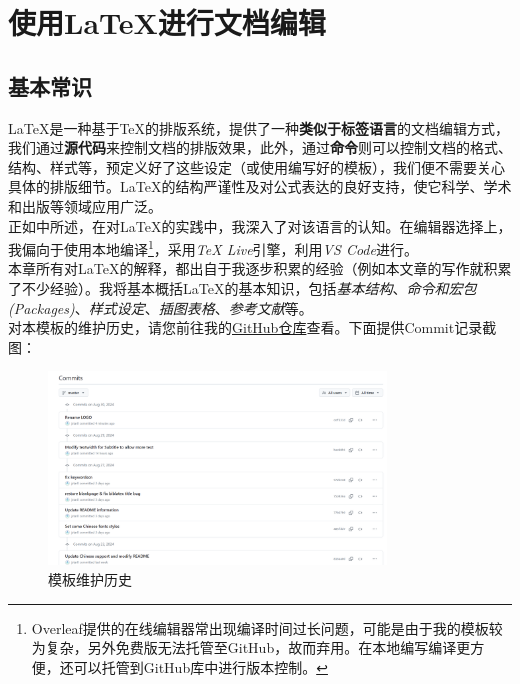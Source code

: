 \chapter{使用\LaTeX{}进行文档编辑}
\label{cp:latex}

\section{基本常识}

\LaTeX{}是一种基于\TeX{}的排版系统，提供了一种\textbf{类似于标签语言}的文档编辑方式，我们通过\textbf{源代码}来控制文档的排版效果，此外，通过\textbf{命令}则可以控制文档的格式、结构、样式等，预定义好了这些设定（或使用编写好的模板），我们便不需要关心具体的排版细节。\LaTeX{}的结构严谨性及对公式表达的良好支持，使它科学、学术和出版等领域应用广泛。\\

正如中所述，在对\LaTeX{}的实践中，我深入了对该语言的认知。在编辑器选择上，我偏向于使用本地编译\footnote{Overleaf提供的在线编辑器常出现编译时间过长问题，可能是由于我的模板较为复杂，另外免费版无法托管至GitHub，故而弃用。在本地编写编译更方便，还可以托管到GitHub库中进行版本控制。}，采用\textit{TeX Live}引擎，利用\textit{VS Code}进行。\\

本章所有对\LaTeX{}的解释，都出自于我逐步积累的经验（例如本文章的写作就积累了不少经验）。我将基本概括\LaTeX{}的基本知识，包括\textit{基本结构}、\textit{命令和宏包(Packages)}、\textit{样式设定}、\textit{插图表格}、\textit{参考文献}等。\\

对本模板的维护历史，请您前往我的\href{https://github.com/jstar0/LaTeXTemplate}{GitHub仓库}查看。下面提供Commit记录截图：

\begin{figure}[h!]
    \centering
    \includegraphics[width=0.8\textwidth]{Figures/git-latex-history.png}
    \caption{模板维护历史}
    \label{fig:git-history}
\end{figure}

